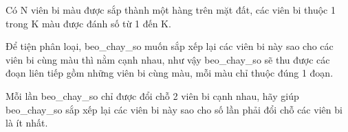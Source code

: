 Có N viên bi màu được sắp thành một hàng trên mặt đất, các viên bi thuộc 1 trong K màu được đánh số từ 1 đến K.  

   Để tiện phân loại, beo\_chay\_so muốn sắp xếp lại các viên bi này sao cho các viên bi cùng màu thì nằm cạnh nhau, như vậy beo\_chay\_so sẽ thu được các đoạn liên tiếp gồm những viên bi cùng màu, mỗi màu chỉ thuộc đúng 1 đoạn.  

   Mỗi lần beo\_chay\_so chỉ được đổi chỗ 2 viên bi cạnh nhau, hãy giúp beo\_chay\_so sắp xếp lại các viên bi này sao cho số lần phải đổi chỗ các viên bi là ít nhất.